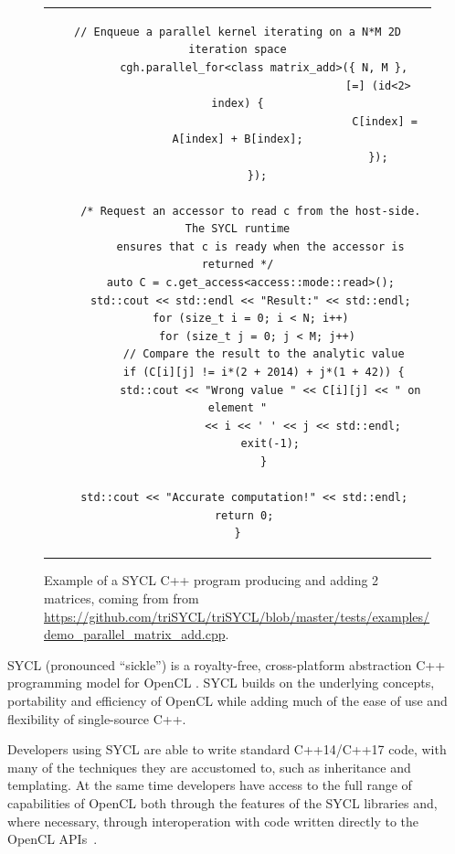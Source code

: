 \documentclass[sigplan]{acmart}
\begin{document}
\begin{figure}
\begin{tabular}{c}
\begin{lstlisting}[basicstyle=\scriptsize]
        // Enqueue a parallel kernel iterating on a N*M 2D iteration space
        cgh.parallel_for<class matrix_add>({ N, M },
                                           [=] (id<2> index) {
                                             C[index] = A[index] + B[index];
                                           });
      });

    /* Request an accessor to read c from the host-side. The SYCL runtime
       ensures that c is ready when the accessor is returned */
    auto C = c.get_access<access::mode::read>();
    std::cout << std::endl << "Result:" << std::endl;
    for (size_t i = 0; i < N; i++)
      for (size_t j = 0; j < M; j++)
        // Compare the result to the analytic value
        if (C[i][j] != i*(2 + 2014) + j*(1 + 42)) {
          std::cout << "Wrong value " << C[i][j] << " on element "
                    << i << ' ' << j << std::endl;
          exit(-1);
        }

  std::cout << "Accurate computation!" << std::endl;
  return 0;
}
    \end{lstlisting}
  \end{tabular}
  \caption{Example of a SYCL C++ program producing and adding 2
    matrices, coming from from
    \url{https://github.com/triSYCL/triSYCL/blob/master/tests/examples/demo_parallel_matrix_add.cpp}.\label{fig:SYCL-example}}
\end{figure}

SYCL \cite{SYCL-1.2,SYCL-2.2-provisional} (pronounced ``sickle'') is a
royalty-free, cross-platform abstraction C++ programming model for
OpenCL \cite{OpenCL-API-2.2-provisional,
  OpenCL-C++-2.2-provisional}. SYCL builds on the underlying concepts,
portability and efficiency of OpenCL while adding much of the ease of
use and flexibility of single-source C++.

Developers using SYCL are able to write standard C++14/C++17 code,
with many of the techniques they are accustomed to, such as
inheritance and templating. At the same time developers have access to
the full range of capabilities of OpenCL both through the features of
the SYCL libraries and, where necessary, through interoperation with
code written directly to the OpenCL
APIs~\cite{OpenCL-API-2.2-provisional}.
\end{document}
